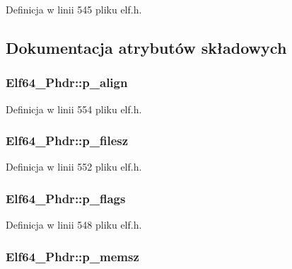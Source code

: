 Definicja w linii 545 pliku elf.\-h.



\subsection{Dokumentacja atrybutów składowych}
\hypertarget{struct_elf64___phdr_aa89a4b1835998c8866e821d777a2f879}{
\subsubsection[{p\-\_\-align}]{ Elf64\-\_\-\-Phdr\-::p\-\_\-align}}\label{struct_elf64___phdr_aa89a4b1835998c8866e821d777a2f879}


Definicja w linii 554 pliku elf.\-h.

\hypertarget{struct_elf64___phdr_af50e5756da2acda5ccb02ebaa3367092}{
\subsubsection[{p\-\_\-filesz}]{ Elf64\-\_\-\-Phdr\-::p\-\_\-filesz}}\label{struct_elf64___phdr_af50e5756da2acda5ccb02ebaa3367092}


Definicja w linii 552 pliku elf.\-h.

\hypertarget{struct_elf64___phdr_ab96e7784733c2192a76d5a42897cb38b}{
\subsubsection[{p\-\_\-flags}]{ Elf64\-\_\-\-Phdr\-::p\-\_\-flags}}\label{struct_elf64___phdr_ab96e7784733c2192a76d5a42897cb38b}


Definicja w linii 548 pliku elf.\-h.

\hypertarget{struct_elf64___phdr_a55fae01175fc4e3f1c23e52b14459235}{
\subsubsection[{p\-\_\-memsz}]{ Elf64\-\_\-\-Phdr\-::p\-\_\-memsz}}\label{struct_elf64___phdr_a55fae01175fc4e3f1c23e52b14459235}


